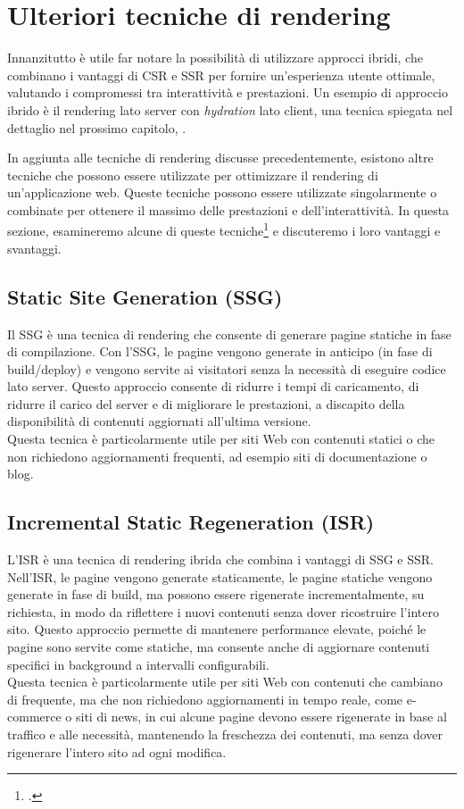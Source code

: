 \section{Ulteriori tecniche di rendering}

Innanzitutto è utile far notare la possibilità di utilizzare approcci ibridi, che
combinano i vantaggi di CSR e SSR per fornire un'esperienza utente ottimale, valutando i compromessi tra interattività e
prestazioni. Un esempio di approccio ibrido è il rendering lato server con \emph{hydration} lato client, una tecnica spiegata nel dettaglio nel prossimo capitolo, .

In aggiunta alle tecniche di rendering discusse precedentemente, esistono altre tecniche che possono essere utilizzate per ottimizzare il rendering di un'applicazione web.
Queste tecniche possono essere utilizzate singolarmente o combinate per ottenere il massimo delle prestazioni e dell'interattività. In questa sezione, esamineremo alcune di queste tecniche\footcite{rendering} e discuteremo i loro vantaggi e svantaggi.

\subsection{Static Site Generation (SSG)}
Il SSG è una tecnica di rendering che consente di generare pagine statiche in
fase di compilazione. Con l'SSG, le pagine vengono generate in anticipo (in fase di build/deploy) e vengono servite ai
visitatori senza la necessità di eseguire codice lato server. Questo approccio consente di ridurre i tempi di
caricamento, di ridurre il carico del server e di migliorare le prestazioni, a discapito della disponibilità di
contenuti aggiornati all'ultima versione.\\
Questa tecnica è particolarmente utile per siti Web con contenuti statici o che non richiedono aggiornamenti frequenti,
ad esempio siti di documentazione o blog.

\subsection{Incremental Static Regeneration (ISR)}
L'ISR è una tecnica di rendering ibrida che combina i vantaggi di SSG
e SSR. Nell'ISR, le pagine vengono generate staticamente, le pagine statiche vengono generate in fase di build, ma
possono essere rigenerate incrementalmente, su richiesta, in modo da riflettere i nuovi contenuti senza dover
ricostruire l'intero sito. Questo approccio permette di mantenere performance elevate, poiché le pagine sono servite
come statiche, ma consente anche di aggiornare contenuti specifici in background a intervalli configurabili.\\
Questa tecnica è particolarmente utile per siti Web con contenuti che cambiano di frequente, ma che non richiedono
aggiornamenti in tempo reale, come e-commerce o siti di news, in cui alcune pagine devono essere rigenerate in base al
traffico e alle necessità, mantenendo la freschezza dei contenuti, ma senza dover rigenerare l'intero sito ad ogni
modifica.


